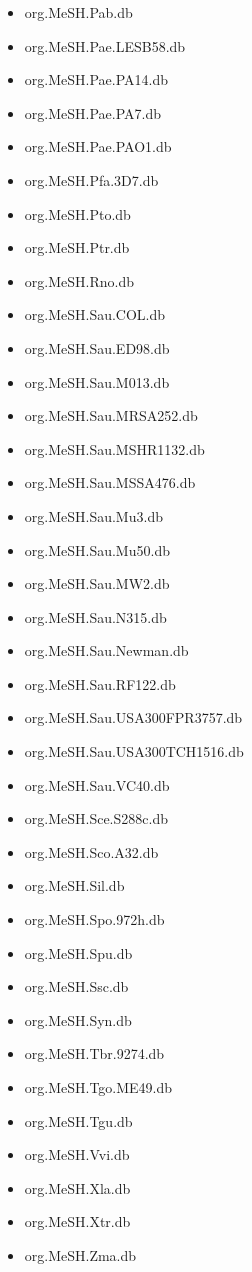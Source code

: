 \documentclass[margin,line,10pt]{res}
\newenvironment{list1}{
  \begin{list}{\ding{113}}{%
      \setlength{\itemsep}{0in}
      \setlength{\parsep}{0in} \setlength{\parskip}{0in}
      \setlength{\topsep}{0in} \setlength{\partopsep}{0in} 
      \setlength{\leftmargin}{0.17in}}}{\end{list}}
\begin{document}
\begin{resume}
\begin{list1}
\begin{multicols}{2}
\begin{itemize}
\item org.MeSH.Pab.db 
\item org.MeSH.Pae.LESB58.db 
\item org.MeSH.Pae.PA14.db
\item org.MeSH.Pae.PA7.db
\item org.MeSH.Pae.PAO1.db 
\item org.MeSH.Pfa.3D7.db
\item org.MeSH.Pto.db 
\item org.MeSH.Ptr.db 
\item org.MeSH.Rno.db  
\item org.MeSH.Sau.COL.db 
\item org.MeSH.Sau.ED98.db
\item org.MeSH.Sau.M013.db 
\item org.MeSH.Sau.MRSA252.db 
\item org.MeSH.Sau.MSHR1132.db
\item org.MeSH.Sau.MSSA476.db
\item org.MeSH.Sau.Mu3.db
\item org.MeSH.Sau.Mu50.db 
\item org.MeSH.Sau.MW2.db  
\item org.MeSH.Sau.N315.db 
\item org.MeSH.Sau.Newman.db 
\item org.MeSH.Sau.RF122.db 
\item org.MeSH.Sau.USA300FPR3757.db 
\item org.MeSH.Sau.USA300TCH1516.db 
\item org.MeSH.Sau.VC40.db
\item org.MeSH.Sce.S288c.db 
\item org.MeSH.Sco.A32.db 
\item org.MeSH.Sil.db 
\item org.MeSH.Spo.972h.db
\item org.MeSH.Spu.db
\item org.MeSH.Ssc.db 
\item org.MeSH.Syn.db 
\item org.MeSH.Tbr.9274.db 
\item org.MeSH.Tgo.ME49.db
\item org.MeSH.Tgu.db 
\item org.MeSH.Vvi.db 
\item org.MeSH.Xla.db  
\item org.MeSH.Xtr.db 
\item org.MeSH.Zma.db
\end{itemize}
\end{multicols}



\end{list1}
\end{resume}
\end{document}
